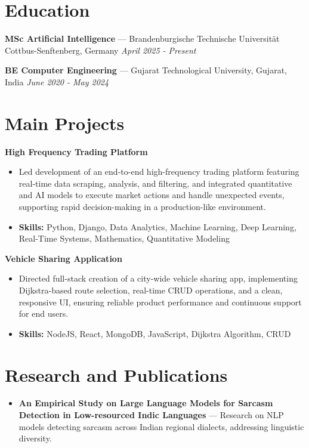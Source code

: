 \documentclass[a4paper,10pt]{article}
\begin{document}
\section*{Education}
\textbf{MSc Artificial Intelligence} — Brandenburgische Technische Universität Cottbus-Senftenberg, Germany \hfill \textit{April 2025 - Present}\par
\vspace{1.5pt}
\textbf{BE Computer Engineering} — Gujarat Technological University, Gujarat, India \hfill \textit{June 2020 - May 2024}\par

\section*{Main Projects}
\textbf{High Frequency Trading Platform}\par
\vspace{1pt}
\begin{itemize}
  \item Led development of an end-to-end high-frequency trading platform featuring real-time data scraping, analysis, and filtering, and integrated quantitative and AI models to execute market actions and handle unexpected events, supporting rapid decision-making in a production-like environment.
  \item \textbf{Skills:} Python, Django, Data Analytics, Machine Learning, Deep Learning, Real-Time Systems, Mathematics, Quantitative Modeling
\end{itemize}
\vspace{3pt}
\textbf{Vehicle Sharing Application}\par
\vspace{1pt}
\begin{itemize}
  \item Directed full-stack creation of a city-wide vehicle sharing app, implementing Dijkstra-based route selection, real-time CRUD operations, and a clean, responsive UI, ensuring reliable product performance and continuous support for end users.
  \item \textbf{Skills:} NodeJS, React, MongoDB, JavaScript, Dijkstra Algorithm, CRUD
\end{itemize}

\section*{Research and Publications}
\begin{itemize}
\item \textbf{An Empirical Study on Large Language Models for Sarcasm Detection in Low-resourced Indic Languages} — Research on NLP models detecting sarcasm across Indian regional dialects, addressing linguistic diversity.
\end{itemize}
\end{document}
